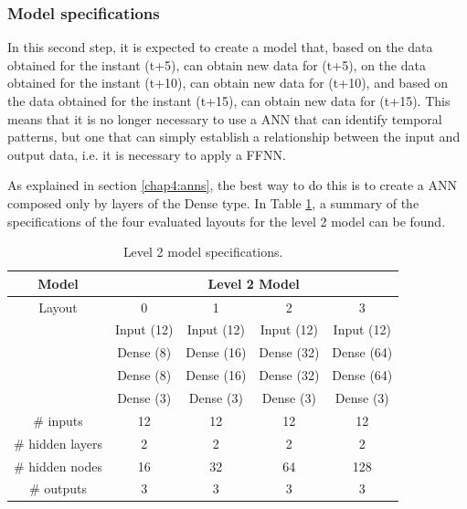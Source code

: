 \subsubsection{Model specifications}


In this second step, it is expected to create a model that, based on the data obtained for the instant (t+5), can obtain new data for (t+5), on the data obtained for the instant (t+10), can obtain new data for (t+10), and based on the data obtained for the instant (t+15), can obtain new data for (t+15). This means that it is no longer necessary to use a \ac{ANN} that can identify temporal patterns, but one that can simply establish a relationship between the input and output data, i.e. it is necessary to apply a \ac{FFNN}. 

As explained in section \ref{chap4:anns}, the best way to do this is to create a \ac{ANN} composed only by layers of the Dense type. In Table \ref{tab:level2arch}, a summary of the specifications of the four evaluated layouts for the level 2 model can be found.

\begin{table}[htbp]
  \centering
  \caption{Level 2 model specifications.}
    \begin{tabular}{c|cccc}
    \toprule
    \textbf{Model} & \multicolumn{4}{c}{Level 2 Model} \\
    \midrule
    Layout & 0     & 1      & 2     & 3 \\
    \midrule
          & Input (12) & Input (12) & Input (12) & Input (12) \\
          & Dense (8) & Dense (16) & Dense (32) & Dense (64) \\
          & Dense (8) & Dense (16) & Dense (32) & Dense (64) \\
          & Dense (3) & Dense (3) & Dense (3) & Dense (3) \\
    \midrule
    \# inputs & 12    & 12    & 12    & 12 \\
    \# hidden layers & 2     & 2     & 2     & 2 \\
    \# hidden nodes & 16    & 32    & 64    & 128 \\
    \# outputs & 3     & 3     & 3     & 3 \\
    \end{tabular}%
  \label{tab:level2arch}%
\end{table}%



